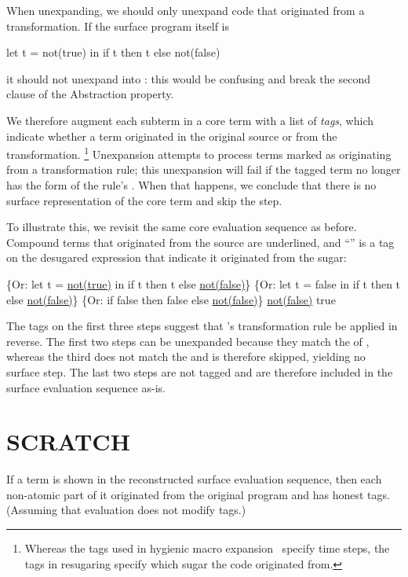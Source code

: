 When unexpanding, we should only unexpand code that
originated from a transformation. If the surface program itself is
\begin{Codes}
let t = not(true) in
  if t then t else not(false)
\end{Codes}
it should not unexpand into :
this would be confusing and break the second clause of the Abstraction property.

We therefore augment each subterm in a core term
with a list of \emph{tags}, which indicate whether a term
originated in the original source or from the transformation.%
\footnote{Whereas the tags used in hygienic macro
  expansion~\cite{hygienic-macros} specify time steps,
  the tags in resugaring specify which sugar the
  code originated from.}
Unexpansion attempts to process terms marked as
originating from a transformation rule; this
unexpansion will fail if the tagged term no longer has the form of
the rule's . When that happens, we conclude that there is no
surface representation of the core term and skip the step.

To illustrate this, we revisit the same core evaluation sequence as
before. Compound terms that originated from the source are underlined, and
``'' is a tag on the desugared expression that indicate it
originated from the  sugar:
\begin{Codes}
    \{Or: let t = \underline{not(true)} in
      if t then t else \underline{not(false)}\}
\CoreStep \{Or: let t = false in
      if t then t else \underline{not(false)}\}
\CoreStep \{Or: if false then false else \underline{not(false)}\}
\CoreStep \underline{not(false)}
\CoreStep true
\end{Codes}
The tags on the first three steps suggest that 's transformation
rule be applied in reverse. The first two steps can be unexpanded because
they match the  of , whereas the third
does not match the  and is therefore skipped,
yielding no surface step.  The last two steps are not tagged and are
therefore included in the surface evaluation sequence as-is.


\section{SCRATCH}

If a term is shown in the reconstructed surface evaluation sequence, then
each non-atomic part of it originated from the original program and
has honest tags. (Assuming that evaluation does not modify tags.)

